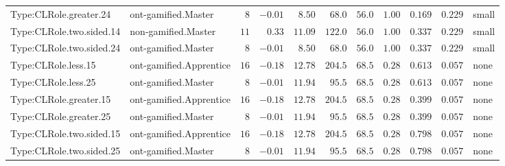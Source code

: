 \documentclass[6pt,a4paper]{article}
\begin{document}
{\begin{longtable}{llrrrrrrrrl}
Type:CLRole.greater.24&ont-gamified.Master&$ 8$&$-0.01$&$ 8.50$&$  68.0$&$ 56.0$&$ 1.00$&$0.169$&$0.229$&small\tabularnewline
Type:CLRole.two.sided.14&non-gamified.Master&$11$&$ 0.33$&$11.09$&$ 122.0$&$ 56.0$&$ 1.00$&$0.337$&$0.229$&small\tabularnewline
Type:CLRole.two.sided.24&ont-gamified.Master&$ 8$&$-0.01$&$ 8.50$&$  68.0$&$ 56.0$&$ 1.00$&$0.337$&$0.229$&small\tabularnewline
Type:CLRole.less.15&ont-gamified.Apprentice&$16$&$-0.18$&$12.78$&$ 204.5$&$ 68.5$&$ 0.28$&$0.613$&$0.057$&none\tabularnewline
Type:CLRole.less.25&ont-gamified.Master&$ 8$&$-0.01$&$11.94$&$  95.5$&$ 68.5$&$ 0.28$&$0.613$&$0.057$&none\tabularnewline
Type:CLRole.greater.15&ont-gamified.Apprentice&$16$&$-0.18$&$12.78$&$ 204.5$&$ 68.5$&$ 0.28$&$0.399$&$0.057$&none\tabularnewline
Type:CLRole.greater.25&ont-gamified.Master&$ 8$&$-0.01$&$11.94$&$  95.5$&$ 68.5$&$ 0.28$&$0.399$&$0.057$&none\tabularnewline
\newpage
Type:CLRole.two.sided.15&ont-gamified.Apprentice&$16$&$-0.18$&$12.78$&$ 204.5$&$ 68.5$&$ 0.28$&$0.798$&$0.057$&none\tabularnewline
Type:CLRole.two.sided.25&ont-gamified.Master&$ 8$&$-0.01$&$11.94$&$  95.5$&$ 68.5$&$ 0.28$&$0.798$&$0.057$&none\tabularnewline
\hline
\end{longtable}}
\end{document}
